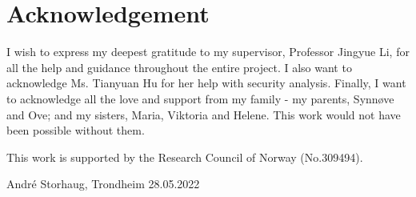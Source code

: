 \chapter*{Acknowledgement}
I wish to express my deepest gratitude to my supervisor, Professor Jingyue Li, for all the help and guidance throughout the entire project. I also want to acknowledge Ms. Tianyuan Hu for her help with security analysis. Finally, I want to acknowledge all the love and support from my family - my parents, Synnøve and Ove; and my sisters, Maria, Viktoria and Helene. This work would not have been possible without them.

\bigskip\noindent
This work is supported by the Research Council of Norway (No.309494).

\begin{flushright}
    André Storhaug, Trondheim 28.05.2022
\end{flushright}